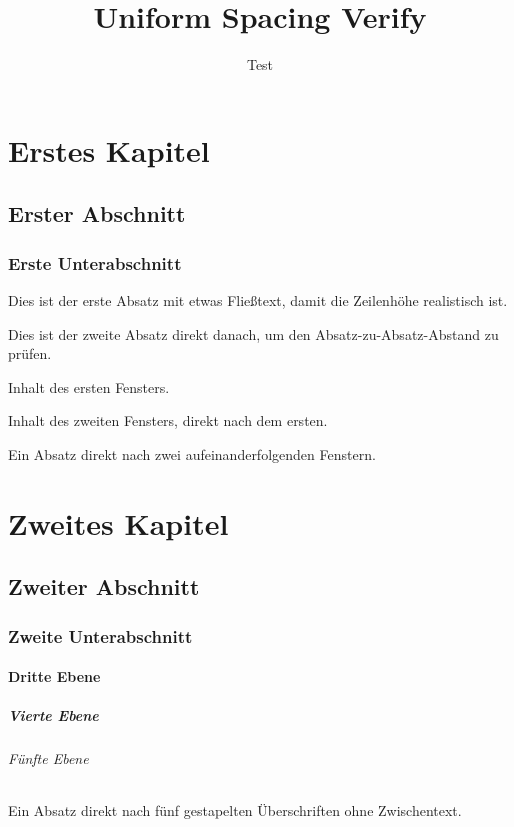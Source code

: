 \documentclass[type=report,theme=dark,language=de]{semio}
\title{Uniform Spacing Verify}
\author{Test}
\begin{document}
\chapter{Erstes Kapitel}
\section{Erster Abschnitt}
\subsection{Erste Unterabschnitt}

Dies ist der erste Absatz mit etwas Flie\ss text, damit die Zeilenh\"ohe realistisch ist.

Dies ist der zweite Absatz direkt danach, um den Absatz-zu-Absatz-Abstand zu pr\"ufen.

\begin{Figure}[title=Erstes Fenster]
  Inhalt des ersten Fensters.
\end{Figure}

\begin{Figure}[title=Zweites Fenster]
  Inhalt des zweiten Fensters, direkt nach dem ersten.
\end{Figure}

Ein Absatz direkt nach zwei aufeinanderfolgenden Fenstern.

\chapter{Zweites Kapitel}
\section{Zweiter Abschnitt}
\subsection{Zweite Unterabschnitt}
\subsubsection{Dritte Ebene}
\paragraph{Vierte Ebene}
\subparagraph{F\"unfte Ebene}

Ein Absatz direkt nach f\"unf gestapelten \"Uberschriften ohne Zwischentext.

\begin{Table}[title=Testtabelle]
\end{Table}
\end{document}
